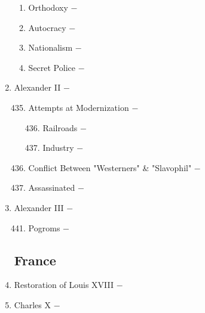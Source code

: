 \documentclass[12pt]{article}
\begin{document}
\begin{enumerate}
\begin{enumerate}[label=\arabic{*}.]
\item Orthodoxy $-$

\item Autocracy $-$ 

\item Nationalism $-$ 

\item Secret Police $-$ 

\end{enumerate}

\setcounter{enumi}{433}

\item Alexander II $-$ 

\begin{enumerate}[label=\arabic{*}.]
\setcounter{enumii}{434}

\item Attempts at Modernization $-$

\begin{enumerate}[label=\arabic{*}.]
\setcounter{enumiii}{435}

\item Railroads $-$ 

\item Industry $-$

\end{enumerate}
\setcounter{enumii}{437}

\item Conflict Between "Westerners" \& "Slavophil" $-$

\item Assassinated $-$

\end{enumerate}
\setcounter{enumi}{439}

\item Alexander III $-$ 


\begin{enumerate}[label=\arabic{*}.]
\setcounter{enumii}{440}

\item Pogroms $-$ 

\end{enumerate}
\setcounter{enumi}{441}

\subsection{France}

\item Restoration of Louis XVIII $-$ 

\item Charles X $-$ 


\end{enumerate}
\end{document}
